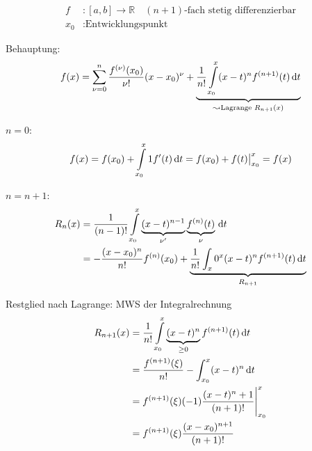 \begin{align*}
	f&: [a, b] \to \mathbb{R} \quad\text{$(n+1)$-fach stetig differenzierbar} \\
	x_0&: \text{Entwicklungspunkt}
\end{align*}

Behauptung:
\begin{equation*}
	f(x) = \sum_{\nu = 0}^n \frac{f^{(\nu)} (x_0)}{\nu !} (x - x_0)^{\nu} + \underbrace{\frac{1}{n!} \int\limits_{x_0}^x (x - t)^n f^{(n+1)} (t) \,\mathrm d t}_{\leadsto \text{Lagrange } R_{n+1}(x)}
\end{equation*}

$n=0$:
\begin{equation*}
	f(x) = f(x_0) + \int\limits_{x_0}^x 1 f'(t) \,\mathrm d t = f(x_0) + f(t) \big|_{x_0}^x = f(x)
\end{equation*}

$n = n+1$:
\begin{align*}
	R_n(x) &= \frac{1}{(n-1)!} \int\limits_{x_0}^x \underbrace{(x-t)^{n-1}}_{\nu '} \underbrace{f^{(n)}(t)}_{\nu} \,\mathrm d t\\
	&= - \frac{(x-x_0)^n}{n!} f^{(n)} (x_0) + \underbrace{\frac{1}{n!} \int_x0^x (x-t)^n f^{(n+1)} (t) \,\mathrm d t}_{R_{n+1}}
\end{align*}
\begin{note}
	Restglied nach Lagrange: MWS der Integralrechnung
	\begin{align*}
		R_{n+1} (x) &= \frac{1}{n!} \int\limits_{x_0}^x \underbrace{(x-t)^n}_{\geq 0} f^{(n+1)} (t) \,\mathrm d t \\
		&= \frac{f^{(n+1)}(\xi)}{n!} - \int_{x_0}^x (x-t)^n \,\mathrm d t \\
		&= f^{(n+1)} (\xi) (-1) \frac{(x-t)^n+1}{(n+1)!}\Bigg|_{x_0}^x \\
		&= f^{(n+1)} (\xi) \frac{(x-x_0)^{n+1}}{(n+1)!}
	\end{align*}
\end{note}






















